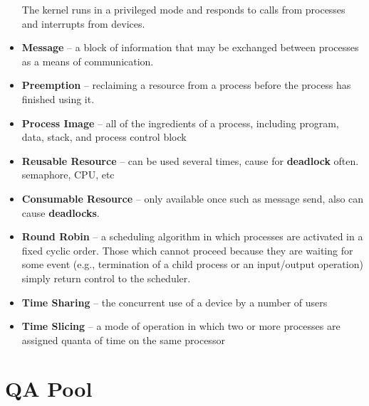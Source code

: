\documentclass[fontsize=5pt]{scrartcl}
\begin{document}
\begin{multicols}{3}
\begin{itemize}
              The kernel runs in a privileged mode and responds to calls from processes and interrupts from devices.
      \item \textbf{Message} – a block of information that may be exchanged between processes as a means of communication.
      \item \textbf{Preemption} – reclaiming a resource from a process before the process has finished using it.
      \item \textbf{Process Image} – all of the ingredients of a process, including program, data, stack, and process control block
      \item \textbf{Reusable Resource} – can be used several times, cause for \textbf{deadlock} often. semaphore, CPU, etc
      \item \textbf{Consumable Resource} – only available once such as message send, also can cause \textbf{deadlocks}.
      \item \textbf{Round Robin} – a scheduling algorithm in which processes are activated in a fixed cyclic order.  Those which cannot proceed because they are waiting for some event 
                    (e.g., termination of a child process or an input/output operation) simply return control to the scheduler.
      \item \textbf{Time Sharing} – the concurrent use of a device by a number of users
      \item \textbf{Time Slicing} – a mode of operation in which two or more processes are assigned quanta of time on the same processor
    \end{itemize}
  \section{QA Pool}

\end{multicols}
\end{document}
